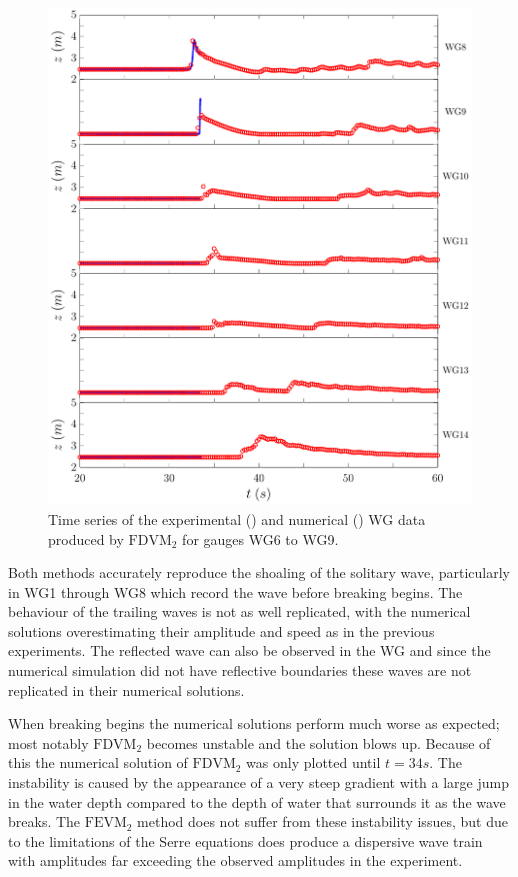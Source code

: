 \begin{figure}
	\centering
	\includegraphics[width=\textwidth]{./chp6/figures/Experiment/Roeber/Trial8/FDVM/LongWGs2.pdf}
	\caption{Time series of the experimental () and numerical ({\color{blue}\solidrule}) WG data produced by $\text{FDVM}_2$ for gauges WG6 to WG9.}
	\label{fig:Roeber8WG6to9FDVM}
\end{figure} 

Both methods accurately reproduce the shoaling of the solitary wave, particularly in WG1 through WG8 which record the wave before breaking begins. The behaviour of the trailing waves is not as well replicated, with the numerical solutions overestimating their amplitude and speed as in the previous experiments. The reflected wave can also be observed in the WG and since the numerical simulation did not have reflective boundaries these waves are not replicated in their numerical solutions.

When breaking begins the numerical solutions perform much worse as expected; most notably $\text{FDVM}_2$ becomes unstable and the solution blows up. Because of this the numerical solution of $\text{FDVM}_2$ was only plotted until $t = 34s$. The instability is caused by the appearance of a very steep gradient with a large jump in the water depth compared to the depth of water that surrounds it as the wave breaks. The $\text{FEVM}_2$ method does not suffer from these instability issues, but due to the limitations of the Serre equations does produce a dispersive wave train with amplitudes far exceeding the observed amplitudes in the experiment. 

